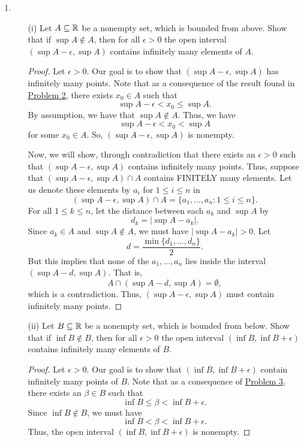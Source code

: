 \documentclass[11pt,a4paper]{article}
\begin{document}
\begin{enumerate}
\begin{proof}
\end{proof}
\item \begin{enumerate} \label{Problem 7}
    \item[(i)] Let \( A \subseteq \mathbb{R}   \) be a nonempty set, which is bounded from above. Show that if \( \sup A \notin A  \), then for all \( \epsilon > 0  \) the open interval \( (\sup A - \epsilon, \sup A ) \) contains infinitely many elements of \( A  \).
        \begin{proof}
            Let \( \epsilon > 0  \). Our goal is to show that \( (\sup A - \epsilon, \sup A ) \) has infinitely many points. Note that as a consequence of the result found in {\hyperref[Problem 2]{Problem 2}}, there exists \( {x}_{0} \in A  \) such that  
            \[  \sup A - \epsilon < {x}_{0} \leq \sup A. \]
            By assumption, we have that \( \sup A \notin A  \). Thus, we have
            \[  \sup A - \epsilon  < {x}_{0} < \sup A  \]
            for some \( {x}_{0} \in A  \). So, \( (\sup A - \epsilon, \sup A ) \) is nonempty.

            Now, we will show, through contradiction that there exists an \( \epsilon > 0  \) such that \( (\sup A - \epsilon, \sup A ) \) contains infinitely many points. Thus, suppose that \( (\sup A - \epsilon , \sup A ) \cap A  \) contains FINITELY many elements. Let us denote these elements by \( {a}_{i} \) for  \( 1 \leq i \leq n  \) in 
        \[  (\sup A - \epsilon, \sup A ) \cap A = \{ {a}_{1}, \dots, {a}_{n}:  1 \leq i \leq n   \}. \]
        For all \( 1 \leq k \leq n  \), let the distance between each \( {a}_{k } \) and \( \sup A  \) by  
            \[  {d}_{k } = | \sup A - {a}_{k} |.  \]
            Since \( {a}_{k } \in A  \) and \( \sup A \notin A  \), we must have \(  | \sup A - {a}_{k } | > 0  \). Let 
            \[  d = \frac{ \min \{ {d}_{1}, \dots, {d}_{n} \}   }{ 2  }.   \]
            But this implies that none of the \( {a}_{1}, \dots, {a}_{n} \) lies inside the interval \( (\sup A - d , \sup A ) \). That is, 
            \[  A \cap (\sup A - d , \sup A ) = \emptyset, \]
            which is a contradiction. Thus, \( (\sup A - \epsilon , \sup A ) \) must contain infinitely many points.


        \end{proof}
    \item[(ii)] Let \( B \subseteq \mathbb{R}  \) be a nonempty set, which is bounded from below. Show that if \( \inf B \notin B  \), then for all \( \epsilon > 0  \) the open interval \( (\inf B , \inf B + \epsilon ) \) contains infinitely many elements of \( B  \).
    \begin{proof}
    Let \( \epsilon > 0  \). Our goal is to show that \( (\inf B, \inf B + \epsilon ) \) contain infinitely many points of \( B  \). Note that as a consequence of {\hyperref[Problem 3]{Problem 3}}, there exists an \( \beta \in B  \) such that  
    \[ \inf B   \leq  \beta < \inf B + \epsilon. \]
    Since \( \inf B \notin B  \), we must have
    \[  \inf B < \beta < \inf B + \epsilon. \]
    Thus, the open interval \( (\inf B, \inf B + \epsilon )  \) is nonempty.


\end{proof}
\end{enumerate}
\end{enumerate}
\end{document}
